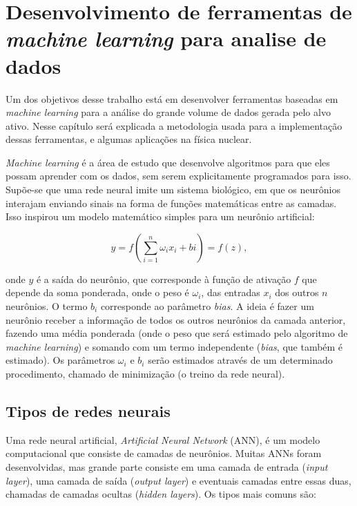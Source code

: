 \documentclass[a4paper,12pt,oneside]{book}
\begin{document}
\chapter{Desenvolvimento de ferramentas de \textit{machine learning} para analise de dados}\label{sec:ml}

\par Um dos objetivos desse trabalho está em desenvolver ferramentas baseadas em \textit{machine learning} para a análise do grande volume de dados gerada pelo alvo ativo. Nesse capítulo será explicada a metodologia usada para a implementação dessas ferramentas, e algumas aplicações na física nuclear.

\par \textit{Machine learning} é a área de estudo que desenvolve algoritmos para que eles possam aprender com os dados, sem serem explicitamente programados para isso\cite{mlbook}. Supõe-se que uma rede neural imite um sistema biológico, em que os neurônios interajam enviando sinais na forma de funções matemáticas entre as camadas. Isso inspirou um modelo matemático simples para um neurônio artificial:

\begin{equation}\label{eq:model_n}
    y = f\left(\sum^{n}_{i = 1}\omega_i x_i + bi\right) = f(z),
\end{equation}

\par onde $y$ é a saída do neurônio, que corresponde à função de ativação $f$ que depende da soma ponderada, onde o peso é $\omega_i$, das entradas $x_i$ dos outros $n$ neurônios. O termo $b_i$ corresponde ao parâmetro \textit{bias}. A ideia é fazer um neurônio receber a informação de todos os outros neurônios da camada anterior, fazendo uma média ponderada (onde o peso que será estimado pelo algoritmo de \textit{machine learning}) e somando com um termo independente (\textit{bias}, que também é estimado). Os parâmetros $\omega_i$ e $b_i$ serão estimados através de um determinado procedimento, chamado de minimização (o treino da rede neural).

\section{Tipos de redes neurais}

\par Uma rede neural artificial, \textit{Artificial Neural Network} (ANN), é um modelo computacional que consiste de camadas de neurônios. Muitas ANNs foram desenvolvidas\cite{mlbook, mldiverso}, mas grande parte consiste em uma camada de entrada (\textit{input layer}), uma camada de saída (\textit{output layer}) e eventuais camadas entre essas duas, chamadas de camadas ocultas (\textit{hidden layers}). Os tipos mais comuns são:
\end{document}
